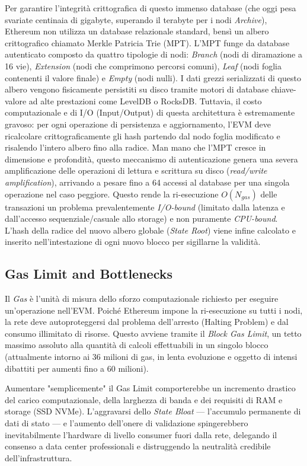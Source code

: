 \documentclass[12pt,a4paper,openright,twoside]{report}
\begin{document}
Per garantire l'integrità crittografica di questo immenso database (che oggi pesa svariate centinaia di gigabyte, superando il terabyte per i nodi \textit{Archive}), Ethereum non utilizza un database relazionale standard, bensì un albero crittografico chiamato Merkle Patricia Trie (MPT). L'MPT funge da database autenticato composto da quattro tipologie di nodi: \textit{Branch} (nodi di diramazione a 16 vie), \textit{Extension} (nodi che comprimono percorsi comuni), \textit{Leaf} (nodi foglia contenenti il valore finale) e \textit{Empty} (nodi nulli). I dati grezzi serializzati di questo albero vengono fisicamente persistiti su disco tramite motori di database chiave-valore ad alte prestazioni come LevelDB o RocksDB. Tuttavia, il costo computazionale e di I/O (Input/Output) di questa architettura è estremamente gravoso: per ogni operazione di persistenza e aggiornamento, l'EVM deve ricalcolare crittograficamente gli hash partendo dal nodo foglia modificato e risalendo l'intero albero fino alla radice. Man mano che l'MPT cresce in dimensione e profondità, questo meccanismo di autenticazione genera una severa amplificazione delle operazioni di lettura e scrittura su disco (\textit{read/write amplification}), arrivando a pesare fino a 64 accessi al database per una singola operazione nel caso peggiore. Questo rende la ri-esecuzione $O(N_{gas})$ delle transazioni un problema prevalentemente \textit{I/O-bound} (limitato dalla latenza e dall'accesso sequenziale/casuale allo storage) e non puramente \textit{CPU-bound}. L'hash della radice del nuovo albero globale (\textit{State Root}) viene infine calcolato e inserito nell'intestazione di ogni nuovo blocco per sigillarne la validità.

\subsection{Gas Limit and Bottlenecks}
Il \textit{Gas} è l'unità di misura dello sforzo computazionale richiesto per eseguire un'operazione nell'EVM. Poiché Ethereum impone la ri-esecuzione su tutti i nodi, la rete deve autoproteggersi dal problema dell'arresto (Halting Problem) e dal consumo illimitato di risorse. Questo avviene tramite il \textit{Block Gas Limit}, un tetto massimo assoluto alla quantità di calcoli effettuabili in un singolo blocco (attualmente intorno ai 36 milioni di gas, in lenta evoluzione e oggetto di intensi dibattiti per aumenti fino a 60 milioni).

Aumentare "semplicemente" il Gas Limit comporterebbe un incremento drastico del carico computazionale, della larghezza di banda e dei requisiti di RAM e storage (SSD NVMe). L'aggravarsi dello \textit{State Bloat} — l'accumulo permanente di dati di stato — e l'aumento dell'onere di validazione spingerebbero inevitabilmente l'hardware di livello consumer fuori dalla rete, delegando il consenso a data center professionali e distruggendo la neutralità credibile dell'infrastruttura.
\end{document}
